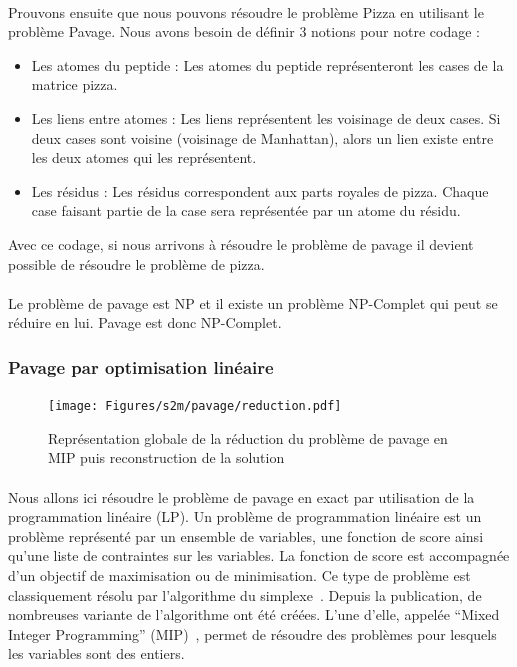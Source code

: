 \documentclass[12pt,french,twoside]{report}
\begin{document}
\paragraph{}Prouvons ensuite que nous pouvons résoudre le problème Pizza en utilisant le problème Pavage.
Nous avons besoin de définir 3 notions pour notre codage :
\begin{itemize}
	\item Les atomes du peptide : Les atomes du peptide représenteront les cases de la matrice pizza.
	\item Les liens entre atomes : Les liens représentent les voisinage de deux cases.
Si deux cases sont voisine (voisinage de Manhattan), alors un lien existe entre les deux atomes qui les représentent.
	\item Les résidus : Les résidus correspondent aux parts royales de pizza.
Chaque case faisant partie de la case sera représentée par un atome du résidu.
\end{itemize}

Avec ce codage, si nous arrivons à résoudre le problème de pavage il devient possible de résoudre le problème de pizza.

\paragraph{}Le problème de pavage est NP et il existe un problème NP-Complet qui peut se réduire en lui.
Pavage est donc NP-Complet.




\subsubsection{Pavage par optimisation linéaire}

\label{MIP_p}

\begin{figure}
  \texttt{[image: Figures/s2m/pavage/reduction.pdf]}
  \caption{\label{reduction}Représentation globale de la réduction du problème de pavage en MIP puis reconstruction de la
  solution}
\end{figure}

\paragraph{}Nous allons ici résoudre le problème de pavage en exact par utilisation de la programmation linéaire (LP). Un
problème de programmation linéaire est un
problème représenté par un ensemble de variables, une fonction de score ainsi qu'une liste de contraintes sur les variables. La
fonction de score est accompagnée d'un objectif de maximisation ou de minimisation. Ce type de problème est classiquement résolu
par l'algorithme du simplexe~\cite{murty_linear_1983}. Depuis la publication, de nombreuses variante de l'algorithme ont été
créées. L'une d'elle, appelée ``Mixed Integer Programming'' (MIP)~\cite{wolsey_mixed_2007}, permet de résoudre des problèmes
pour lesquels les variables sont des entiers.
\end{document}
